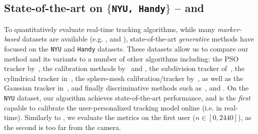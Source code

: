 

\subsection{State-of-the-art on $\{$\texttt{NYU, Handy}$\}$ --
 and }
\label{sec:evalstar}
To quantitatively evaluate real-time tracking algorithms, while many \emph{marker-based} datasets are available (e.g. \cite{qian2014realtime}, \cite{sharp2015accurate} and \cite{yuan2017bighand}), state-of-the-art \emph{generative} methods have focused on the \texttt{NYU} \cite{tompson2014real} and \texttt{Handy} \cite{tkach2016sphere} datasets. 
These datasets allow us to compare our method and its variants to a number of other algorithms including: the PSO tracker by~\cite{sharp2015accurate}, the calibration methods by~\cite{khamis2015learning} and \cite{tan2016fits}, the subdivision tracker of~\cite{taylor2016joint}, the cylindrical tracker in~\cite{htrack}, the sphere-mesh calibration/tracker by~\cite{tkach2016sphere}, as well as the Gaussian tracker in~\cite{sridhar2015fast}, and finally discriminative methods such as~\cite{tompson2014real}, \cite{tang2015opening} and \cite{oberweger2015hands}. 
% 
On the \texttt{NYU} dataset, our algorithm achieves state-of-the-art performance, and is the \emph{first} capable to calibrate the user-personalized tracking model online (i.e. in real-time). Similarly to \cite{taylor2016joint}, we evaluate the metrics on the first user ($n \in [0, 2440]$), as the second is too far from the camera.
%
